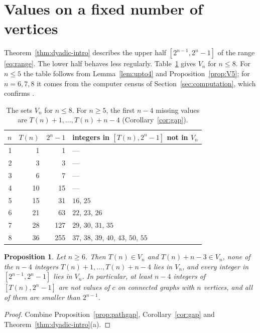 \documentclass[11pt]{amsart}
\newtheorem{proposition}[theorem]{Proposition}
\theoremstyle{definition}
\theoremstyle{remark}
\newcommand{\Tr}[1]{T(#1)}
\begin{document}
\section{Values on a fixed number of vertices}\label{sec:fixed}

Theorem~\ref{thm:dyadic-intro} describes the upper half $[2^{n-1},2^n-1]$ of the range \eqref{eq:range}. The lower half behaves less regularly. Table~\ref{tab:Vn} gives $V_n$ for $n\le8$. For $n\le5$ the table follows from Lemma~\ref{lem:upto4} and Proposition~\ref{prop:V5}; for $n=6,7,8$ it comes from the computer census of Section~\ref{sec:computation}, which confirms \cite[Remark~3.20]{CORa}.

\begin{table}[ht]
\centering
\small
\begin{tabular}{rrrl}
\toprule
$n$ & $\Tr{n}$ & $2^n-1$ & integers in $[\Tr{n},2^n-1]$ not in $V_n$\\
\midrule
1 & 1 & 1 & ---\\
2 & 3 & 3 & ---\\
3 & 6 & 7 & ---\\
4 & 10 & 15 & ---\\
5 & 15 & 31 & $16$, $25$\\
6 & 21 & 63 & $22$, $23$, $26$\\
7 & 28 & 127 & $29$, $30$, $31$, $35$\\
8 & 36 & 255 & $37$, $38$, $39$, $40$, $43$, $50$, $55$\\
\bottomrule
\end{tabular}
\caption{The sets $V_n$ for $n\le8$. For $n\ge5$, the first $n-4$ missing values are $\Tr{n}+1,\dots,\Tr{n}+n-4$ (Corollary~\ref{cor:gap}).}
\label{tab:Vn}
\end{table}

\begin{proposition}\label{prop:fixed}
Let $n\ge6$. Then $\Tr{n}\in V_n$ and $\Tr{n}+n-3\in V_n$, none of the $n-4$ integers $\Tr{n}+1,\dots,\Tr{n}+n-4$ lies in $V_n$, and every integer in $[2^{n-1},2^n-1]$ lies in $V_n$. In particular, at least $n-4$ integers of $[\Tr{n},2^n-1]$ are not values of $c$ on connected graphs with $n$ vertices, and all of them are smaller than $2^{n-1}$.
\end{proposition}

\begin{proof}
Combine Proposition~\ref{prop:pathgap}, Corollary~\ref{cor:gap} and Theorem~\ref{thm:dyadic-intro}(a).
\end{proof}
\end{document}
